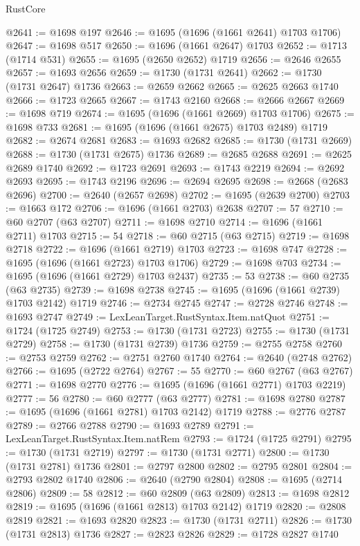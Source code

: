 \begin{lexlean}{RustCore}
\begin{coremodule}
@2641 := @1698 @197
@2646 := @1695 (@1696 (@1661 @2641) @1703 @1706)
@2647 := @1698 @517
@2650 := @1696 (@1661 @2647) @1703
@2652 := @1713 (@1714 @531)
@2655 := @1695 (@2650 @2652) @1719
@2656 := @2646 @2655
@2657 := @1693 @2656
@2659 := @1730 (@1731 @2641)
@2662 := @1730 (@1731 @2647) @1736
@2663 := @2659 @2662
@2665 := @2625 @2663 @1740
@2666 := @1723 @2665
@2667 := @1743 @2160
@2668 := @2666 @2667
@2669 := @1698 @719
@2674 := @1695 (@1696 (@1661 @2669) @1703 @1706)
@2675 := @1698 @733
@2681 := @1695 (@1696 (@1661 @2675) @1703 @2489) @1719
@2682 := @2674 @2681
@2683 := @1693 @2682
@2685 := @1730 (@1731 @2669)
@2688 := @1730 (@1731 @2675) @1736
@2689 := @2685 @2688
@2691 := @2625 @2689 @1740
@2692 := @1723 @2691
@2693 := @1743 @2219
@2694 := @2692 @2693
@2695 := @1743 @2196
@2696 := @2694 @2695
@2698 := @2668 (@2683 @2696)
@2700 := @2640 (@2657 @2698)
@2702 := @1695 (@2639 @2700)
@2703 := @1663 @172
@2706 := @1696 (@1661 @2703) @2638
@2707 := 57
@2710 := @60 @2707 (@63 @2707)
@2711 := @1698 @2710
@2714 := @1696 (@1661 @2711) @1703
@2715 := 54
@2718 := @60 @2715 (@63 @2715)
@2719 := @1698 @2718
@2722 := @1696 (@1661 @2719) @1703
@2723 := @1698 @747
@2728 := @1695 (@1696 (@1661 @2723) @1703 @1706)
@2729 := @1698 @703
@2734 := @1695 (@1696 (@1661 @2729) @1703 @2437)
@2735 := 53
@2738 := @60 @2735 (@63 @2735)
@2739 := @1698 @2738
@2745 := @1695 (@1696 (@1661 @2739) @1703 @2142) @1719
@2746 := @2734 @2745
@2747 := @2728 @2746
@2748 := @1693 @2747
@2749 := LexLeanTarget.RustSyntax.Item.natQuot
@2751 := @1724 (@1725 @2749)
@2753 := @1730 (@1731 @2723)
@2755 := @1730 (@1731 @2729)
@2758 := @1730 (@1731 @2739) @1736
@2759 := @2755 @2758
@2760 := @2753 @2759
@2762 := @2751 @2760 @1740
@2764 := @2640 (@2748 @2762)
@2766 := @1695 (@2722 @2764)
@2767 := 55
@2770 := @60 @2767 (@63 @2767)
@2771 := @1698 @2770
@2776 := @1695 (@1696 (@1661 @2771) @1703 @2219)
@2777 := 56
@2780 := @60 @2777 (@63 @2777)
@2781 := @1698 @2780
@2787 := @1695 (@1696 (@1661 @2781) @1703 @2142) @1719
@2788 := @2776 @2787
@2789 := @2766 @2788
@2790 := @1693 @2789
@2791 := LexLeanTarget.RustSyntax.Item.natRem
@2793 := @1724 (@1725 @2791)
@2795 := @1730 (@1731 @2719)
@2797 := @1730 (@1731 @2771)
@2800 := @1730 (@1731 @2781) @1736
@2801 := @2797 @2800
@2802 := @2795 @2801
@2804 := @2793 @2802 @1740
@2806 := @2640 (@2790 @2804)
@2808 := @1695 (@2714 @2806)
@2809 := 58
@2812 := @60 @2809 (@63 @2809)
@2813 := @1698 @2812
@2819 := @1695 (@1696 (@1661 @2813) @1703 @2142) @1719
@2820 := @2808 @2819
@2821 := @1693 @2820
@2823 := @1730 (@1731 @2711)
@2826 := @1730 (@1731 @2813) @1736
@2827 := @2823 @2826
@2829 := @1728 @2827 @1740

\end{coremodule}
\end{lexlean}
